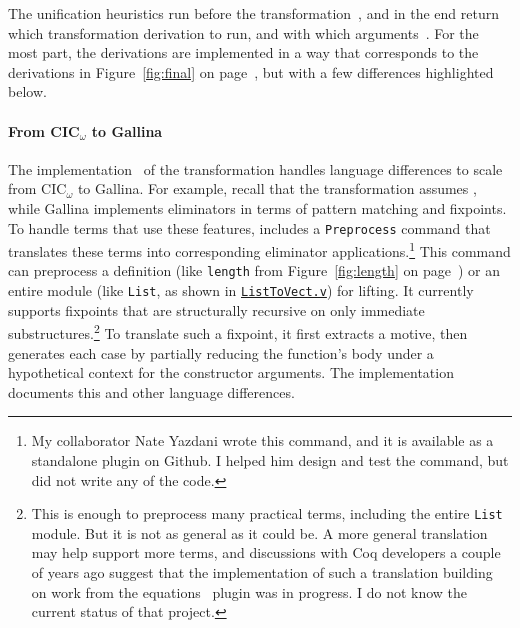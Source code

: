 The unification heuristics run before the transformation~\href{https://github.com/uwplse/pumpkin-pi/blob/v2.0.0/plugin/src/automation/lift/liftconfig.ml}{},
and in the end return which transformation derivation to run,
and with which arguments~\href{https://github.com/uwplse/pumpkin-pi/blob/v2.0.0/plugin/src/automation/lift/liftrules.ml}{}.
For the most part, the derivations are implemented in a way that corresponds to the derivations in Figure~\ref{fig:final}
on page~\pageref{fig:final}, but with a few differences highlighted below.

\paragraph{From CIC$_{\omega}$ to Gallina}
The implementation~\href{https://github.com/uwplse/pumpkin-pi/blob/v2.0.0/plugin/src/automation/lift/lift.ml}{} %
of the transformation handles language differences to scale from CIC$_{\omega}$ to Gallina.
For example, recall that the transformation assumes , while Gallina implements eliminators in terms of pattern matching and fixpoints. 
To handle terms that use these features, \toolnamec includes a \lstinline{Preprocess} command that translates  %
these terms into corresponding eliminator applications.\footnote{My collaborator Nate Yazdani wrote this command, and it is available as a standalone plugin on Github. %
I helped him design and test the command, but did not write any of the code.}
This command can preprocess a definition (like \lstinline{length} from Figure~\ref{fig:length} on page~\pageref{fig:length}) or an entire module
(like \lstinline{List}, as shown in \href{http://github.com/uwplse/ornamental-search/blob/itp+equiv/plugin/coq/examples/ListToVect.v}{\lstinline{ListToVect.v}}) for lifting. %
It currently supports fixpoints that are structurally recursive on only 
immediate substructures.\footnote{This is enough to preprocess many practical terms, including the entire \lstinline{List} module.
But it is not as general as it could be.
A more general translation may help \toolnamec support more terms, and discussions
with Coq developers a couple of years ago suggest that the implementation of such a translation
building on work from the equations~\cite{sozeau:equations} plugin was in progress.
I do not know the current status of that project.}
To translate such a fixpoint, it first extracts a motive, then generates each case
by partially reducing the function's body under a hypothetical context for the constructor arguments.
The implementation documents this and other language differences.

